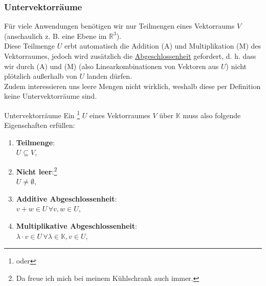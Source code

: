 \subsubsection{Untervektorräume}
Für viele Anwendungen benötigen wir nur Teilmengen eines Vektorraums $V$ (anschaulich z. B. eine Ebene im $\mathbb{R}^3$).\\
Diese Teilmenge $U$ erbt automatisch die Addition (A) und Multiplikation (M) des Vektorraumes, jedoch wird zusätzlich die \underline{Abgeschlossenheit} gefordert, d. h. dass wir durch (A) und (M) (also Linearkombinationen von Vektoren aus $U$) nicht plötzlich außerhalb von $U$ landen dürfen.\\
Zudem interessieren uns leere Mengen nicht wirklich, weshalb diese per Definition keine Untervektorräume sind.
\begin{Def}
{Untervektorräume}
Ein \footnote{oder } $U$ eines Vektorraumes $V$ über $\mathbb{K}$ muss also folgende Eigenschaften erfüllen:
\begin{enumerate}
    \item \textbf{Teilmenge}:\\
    $U\subseteq V$, 
    \item \textbf{Nicht leer}:\footnote{Da freue ich mich bei meinem Kühlschrank auch immer.}\\
    $U\neq\emptyset$, 
    \item \textbf{Additive Abgeschlossenheit}:\\
    $v+w\in U\,\forall v,w\in U$, 
    \item \textbf{Multiplikative Abgeschlossenheit}:\\
    $\lambda \cdot v\in U\,\forall \lambda\in\mathbb{K}, v\in U$, 
\end{enumerate}
\end{Def}

